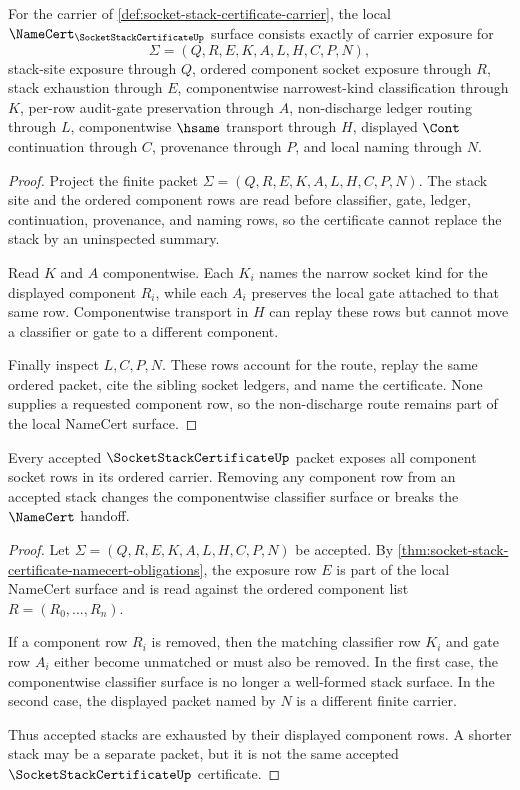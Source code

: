 \begin{theorem}
\label{thm:socket-stack-certificate-namecert-obligations}
For the carrier of \autoref{def:socket-stack-certificate-carrier}, the local $\NameCert_{\SocketStackCertificateUp}$ surface consists exactly of carrier exposure for
$$
\Sigma=(Q,R,E,K,A,L,H,C,P,N),
$$
stack-site exposure through $Q$, ordered component socket exposure through $R$, stack exhaustion through $E$, componentwise narrowest-kind classification through $K$, per-row audit-gate preservation through $A$, non-discharge ledger routing through $L$, componentwise $\hsame$ transport through $H$, displayed $\Cont$ continuation through $C$, provenance through $P$, and local naming through $N$.
\end{theorem}
\begin{proof}
Project the finite packet $\Sigma=(Q,R,E,K,A,L,H,C,P,N)$. The stack site and the ordered component rows are read before classifier, gate, ledger, continuation, provenance, and naming rows, so the certificate cannot replace the stack by an uninspected summary.

Read $K$ and $A$ componentwise. Each $K_i$ names the narrow socket kind for the displayed component $R_i$, while each $A_i$ preserves the local gate attached to that same row. Componentwise transport in $H$ can replay these rows but cannot move a classifier or gate to a different component.

Finally inspect $L,C,P,N$. These rows account for the route, replay the same ordered packet, cite the sibling socket ledgers, and name the certificate. None supplies a requested component row, so the non-discharge route remains part of the local NameCert surface.
\end{proof}

\begin{theorem}
\label{thm:socket-stack-certificate-stack-exhaustion}
Every accepted $\SocketStackCertificateUp$ packet exposes all component socket rows in its ordered carrier. Removing any component row from an accepted stack changes the componentwise classifier surface or breaks the $\NameCert$ handoff.
\end{theorem}
\begin{proof}
Let $\Sigma=(Q,R,E,K,A,L,H,C,P,N)$ be accepted. By \autoref{thm:socket-stack-certificate-namecert-obligations}, the exposure row $E$ is part of the local NameCert surface and is read against the ordered component list $R=(R_0,\ldots,R_n)$.

If a component row $R_i$ is removed, then the matching classifier row $K_i$ and gate row $A_i$ either become unmatched or must also be removed. In the first case, the componentwise classifier surface is no longer a well-formed stack surface. In the second case, the displayed packet named by $N$ is a different finite carrier.

Thus accepted stacks are exhausted by their displayed component rows. A shorter stack may be a separate packet, but it is not the same accepted $\SocketStackCertificateUp$ certificate.
\end{proof}

